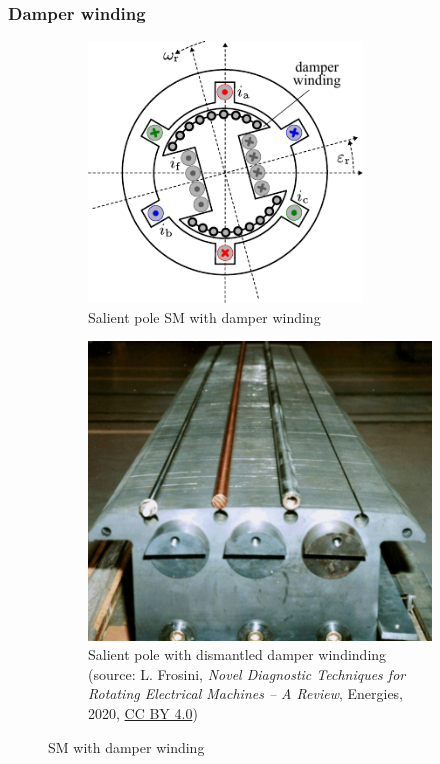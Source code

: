 \begin{frame}
	\frametitle{Damper winding}
	\begin{figure}
		\centering
		\begin{subfigure}{0.49\textwidth}
			\centering
			\includegraphics[width=0.8\textwidth]{fig/lec07/SM_salient_pole_damper_winding.pdf}
			\caption{Salient pole SM with damper winding}
		\end{subfigure}
		\hfill
		\begin{subfigure}{0.49\textwidth}
			\centering
			\includegraphics[height=0.5\textheight]{fig/lec07/Salient_pole_damper_winding.png}
			\caption{Salient pole with dismantled damper windinding (source: L. Frosini, \textit{Novel Diagnostic Techniques for Rotating Electrical Machines -- A Review}, Energies, 2020, \href{https://creativecommons.org/licenses/by/4.0/}{CC BY 4.0})} 
		\end{subfigure}
        \caption{SM with damper winding} 
        \label{fig:SM_damper_winding}
	\end{figure}
\end{frame}


